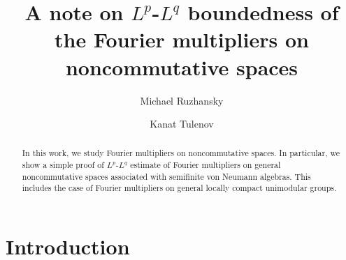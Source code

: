 \documentclass[a4paper,12pt]{amsart}
\numberwithin{equation}{section}
\theoremstyle{definition}
\begin{document}
\title{A note on $L^p$-$L^q$ boundedness of the Fourier multipliers on noncommutative spaces}
\author[Michael Ruzhansky]{Michael Ruzhansky}
\address{
 Michael Ruzhansky:
  \endgraf
 Department of Mathematics: Analysis, Logic and Discrete Mathematics,
  \endgraf
 Ghent University, Ghent,
 \endgraf
  Belgium 
  \endgraf
  and 
 \endgraf
 School of Mathematical Sciences, Queen Mary University of London, London,
 \endgraf
 UK  
 \endgraf
  {\it E-mail address} {\rm michael.ruzhansky@ugent.be}
  } 
  

 \author[Kanat Tulenov]{Kanat Tulenov}
\address{
  Kanat Tulenov:
  \endgraf
  Institute of Mathematics and Mathematical Modeling, 050010, Almaty, 
  \endgraf
  Kazakhstan 
  \endgraf
  and 
  \endgraf
Department of Mathematics: Analysis, Logic and Discrete Mathematics
  \endgraf
 Ghent University, Ghent,
 \endgraf
  Belgium
  \endgraf
  {\it E-mail address} {\rm kanat.tulenov@ugent.be} 
  }
\begin{abstract}
In this work, we study Fourier multipliers on noncommutative spaces. In particular, we show a simple proof of $L^p$-$L^q$ estimate of Fourier multipliers on general noncommutative spaces associated with semifinite von Neumann algebras. This includes the case of Fourier multipliers on general locally compact unimodular groups.
\end{abstract}

\maketitle
\section{Introduction}
\end{document}
